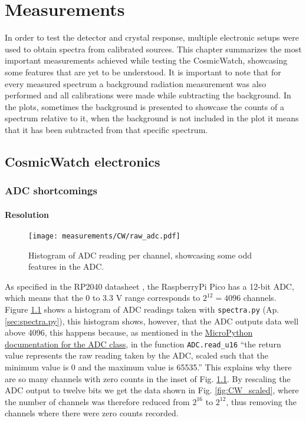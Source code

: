\chapter{Measurements}\label{chap:measurements}

In order to test the detector and crystal response, multiple electronic setups were used to obtain spectra from calibrated sources. This chapter summarizes the most important measurements achieved while testing the CosmicWatch, showcasing some features that are yet to be understood. It is important to note that for every measured spectrum a background radiation measurement was also performed and all calibrations were made while subtracting the background. In the plots, sometimes the background is presented to showcase the counts of a spectrum relative to it, when the background is not included in the plot it means that it has been subtracted from that specific spectrum.

\section{CosmicWatch electronics}\label{sec:CW_measurements}

\subsection{ADC shortcomings}\label{sec:ADC_shortcomings}

\subsubsection{Resolution}

\begin{figure}
  \centering
  \texttt{[image: measurements/CW/raw\_adc.pdf]}
  \caption{\label{fig:CW_raw}Histogram of ADC reading per channel, showcasing some odd features in the ADC.}
\end{figure}

As specified in the RP2040 datasheet \cite[sec.~4.9]{datasheet2024rp2040}, the RaspberryPi Pico has a 12-bit ADC, which means that the 0 to 3.3 \unit{\V} range corresponds to $2^{12}=4096$ channels. Figure \ref{fig:CW_raw} shows a histogram of ADC readings taken with \texttt{spectra.py} (Ap. \ref{sec:spectra.py}), this histogram shows, however, that the ADC outputs data well above 4096, this happens because, as mentioned in the \href{https://docs.micropython.org/en/latest/library/machine.ADC.html#machine.ADC}{MicroPython documentation for the ADC class}, in the function \texttt{ADC.read\_u16} ``the return value represents the raw reading taken by the ADC, scaled such that the minimum value is 0 and the maximum value is 65535.'' This explains why there are so many channels with zero counts in the inset of Fig. \ref{fig:CW_raw}. By rescaling the ADC output to twelve bits we get the data shown in Fig. \ref{fig:CW_scaled}, where the number of channels was therefore reduced from $2^{16}$ to $2^{12}$, thus removing the channels where there were zero counts recorded.

